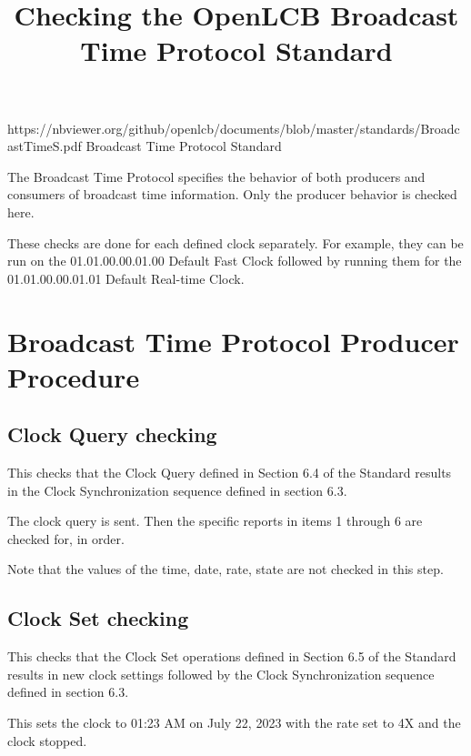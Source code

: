 

\title{Checking the OpenLCB Broadcast Time Protocol Standard}


\maketitle


\introductionCaveats
    {https://nbviewer.org/github/openlcb/documents/blob/master/standards/BroadcastTimeS.pdf}
    {Broadcast Time Protocol Standard}

The Broadcast Time Protocol specifies the behavior of both producers and consumers of 
broadcast time information.  Only the producer behavior is checked here.

These checks are done for each defined clock separately. 
For example, they can be run on the 01.01.00.00.01.00 Default Fast Clock
followed by running them for the 01.01.00.00.01.01 Default Real-time Clock.

\section{Broadcast Time Protocol Producer Procedure}


\subsection{Clock Query checking}

This checks that the Clock Query defined in Section 6.4 of the Standard results in the
Clock Synchronization sequence defined in section 6.3.

The clock query is sent. 
Then the specific reports in items 1 through 6 are checked for, in order.

Note that the values of the time, date, rate, state are not checked in this step.

\subsection{Clock Set checking}

This checks that the Clock Set operations defined in Section 6.5 of the Standard results 
in new clock settings followed by the
Clock Synchronization sequence defined in section 6.3.

This sets the clock to 01:23 AM on July 22, 2023 with the rate set to 4X and the clock stopped.

